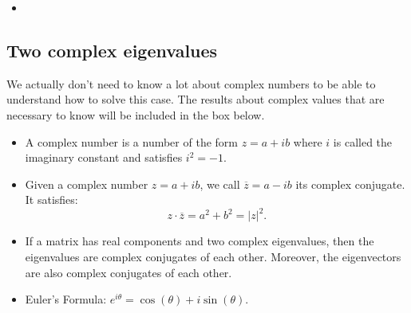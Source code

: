 \begin{video}
	\begin{itemize}
		\item {}
	\end{itemize}
\end{video}





\subsection{Two complex eigenvalues}

We actually don't need to know a lot about complex numbers to be able to understand how to solve this case.
The results about complex values that are necessary to know will be included in the box below.

\begin{definition}
\begin{itemize}
	\item A complex number is a number of the form $z=a+ib$ where $i$ is called the imaginary constant and satisfies $i^2=-1$.
	\item Given a complex number $z=a+ib$, we call $\overline{z}=a-ib$ its complex conjugate. It satisfies:
	$$ z \cdot \overline{z} = a^2+b^2 = |z|^2.$$

	\item If a matrix has real components and two complex eigenvalues, then the eigenvalues are complex conjugates of each other. Moreover, the eigenvectors are also complex conjugates of each other.
	\item Euler's Formula: $e^{i \theta} = \cos(\theta) + i \sin (\theta)$.
\end{itemize}
\end{definition}




